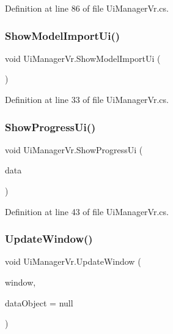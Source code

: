 Definition at line 86 of file Ui\+Manager\+Vr.\+cs.

\mbox{\label{class_ui_manager_vr_a92c0abcedbe5b18632841f7a1a0925e6}} 
\subsubsection{\texorpdfstring{ShowModelImportUi()}{ShowModelImportUi()}}
{\footnotesize\ttfamily void Ui\+Manager\+Vr.\+Show\+Model\+Import\+Ui (\begin{DoxyParamCaption}{ }\end{DoxyParamCaption})}



Definition at line 33 of file Ui\+Manager\+Vr.\+cs.

\mbox{\label{class_ui_manager_vr_ad390498344390d6fc56c98346eac91ed}} 
\subsubsection{\texorpdfstring{ShowProgressUi()}{ShowProgressUi()}}
{\footnotesize\ttfamily void Ui\+Manager\+Vr.\+Show\+Progress\+Ui (\begin{DoxyParamCaption}\item[{\mbox{\hyperlink{class_progress_data}{Progress\+Data}}}]{data }\end{DoxyParamCaption})}



Definition at line 43 of file Ui\+Manager\+Vr.\+cs.

\mbox{\label{class_ui_manager_vr_a456f3ed4e5cb1a0022d9cebfd35d7c82}} 
\subsubsection{\texorpdfstring{UpdateWindow()}{UpdateWindow()}}
{\footnotesize\ttfamily void Ui\+Manager\+Vr.\+Update\+Window (\begin{DoxyParamCaption}\item[{\mbox{\hyperlink{interface_i_window}{I\+Window}}}]{window,  }\item[{object}]{data\+Object = {\ttfamily null} }\end{DoxyParamCaption})}



